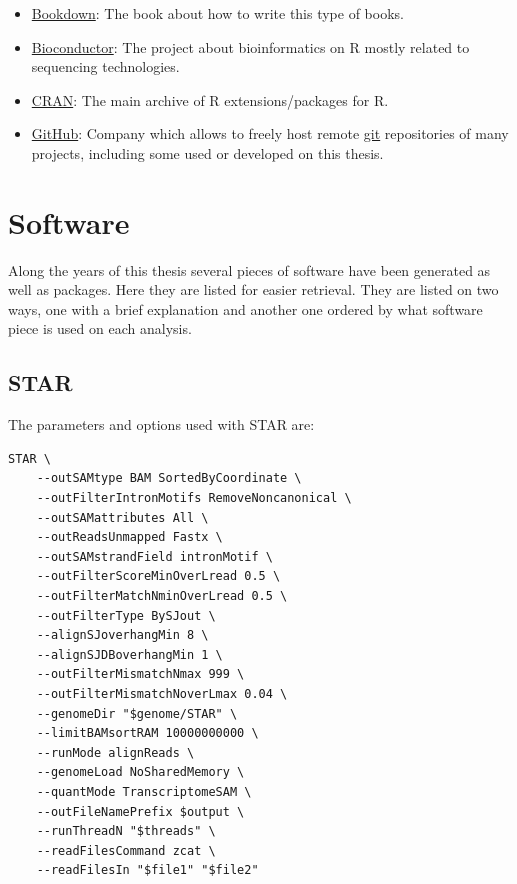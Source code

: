 \documentclass[
  12pt,
  a4paper,
  twoside,
  openright]{book}
\begin{document}
\begin{itemize}
\item
  \href{https://github.com/rstudio/bookdown/}{Bookdown}: The book about how to write this type of books.
\item
  \href{https://bioconducto.org}{Bioconductor}: The project about bioinformatics on R mostly related to sequencing technologies.
\item
  \href{https://cran.r-project.org}{CRAN}: The main archive of R extensions/packages for R.
\item
  \href{https://github.com}{GitHub}: Company which allows to freely host remote \href{https://git-scm.com/}{git} repositories of many projects, including some used or developed on this thesis.
\end{itemize}

\hypertarget{software}{%
\chapter{Software}\label{software}}

Along the years of this thesis several pieces of software have been generated as well as packages.
Here they are listed for easier retrieval.
They are listed on two ways, one with a brief explanation and another one ordered by what software piece is used on each analysis.

\hypertarget{star}{%
\section{STAR}\label{star}}

The parameters and options used with STAR are:

\begin{verbatim}
STAR \
    --outSAMtype BAM SortedByCoordinate \
    --outFilterIntronMotifs RemoveNoncanonical \
    --outSAMattributes All \
    --outReadsUnmapped Fastx \
    --outSAMstrandField intronMotif \
    --outFilterScoreMinOverLread 0.5 \
    --outFilterMatchNminOverLread 0.5 \
    --outFilterType BySJout \
    --alignSJoverhangMin 8 \
    --alignSJDBoverhangMin 1 \
    --outFilterMismatchNmax 999 \
    --outFilterMismatchNoverLmax 0.04 \
    --genomeDir "$genome/STAR" \
    --limitBAMsortRAM 10000000000 \
    --runMode alignReads \
    --genomeLoad NoSharedMemory \
    --quantMode TranscriptomeSAM \
    --outFileNamePrefix $output \
    --runThreadN "$threads" \
    --readFilesCommand zcat \
    --readFilesIn "$file1" "$file2"
\end{verbatim}
\end{document}
